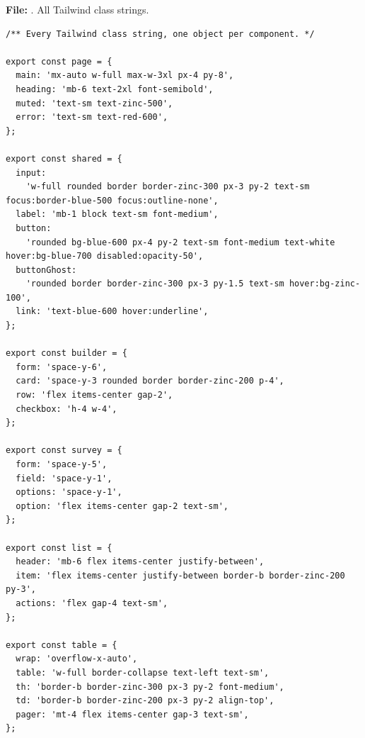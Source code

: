\documentclass[11pt,a4paper]{article}
\begin{document}
\textbf{File:} . All Tailwind class strings.\par
\begin{lstlisting}
/** Every Tailwind class string, one object per component. */

export const page = {
  main: 'mx-auto w-full max-w-3xl px-4 py-8',
  heading: 'mb-6 text-2xl font-semibold',
  muted: 'text-sm text-zinc-500',
  error: 'text-sm text-red-600',
};

export const shared = {
  input:
    'w-full rounded border border-zinc-300 px-3 py-2 text-sm focus:border-blue-500 focus:outline-none',
  label: 'mb-1 block text-sm font-medium',
  button:
    'rounded bg-blue-600 px-4 py-2 text-sm font-medium text-white hover:bg-blue-700 disabled:opacity-50',
  buttonGhost:
    'rounded border border-zinc-300 px-3 py-1.5 text-sm hover:bg-zinc-100',
  link: 'text-blue-600 hover:underline',
};

export const builder = {
  form: 'space-y-6',
  card: 'space-y-3 rounded border border-zinc-200 p-4',
  row: 'flex items-center gap-2',
  checkbox: 'h-4 w-4',
};

export const survey = {
  form: 'space-y-5',
  field: 'space-y-1',
  options: 'space-y-1',
  option: 'flex items-center gap-2 text-sm',
};

export const list = {
  header: 'mb-6 flex items-center justify-between',
  item: 'flex items-center justify-between border-b border-zinc-200 py-3',
  actions: 'flex gap-4 text-sm',
};

export const table = {
  wrap: 'overflow-x-auto',
  table: 'w-full border-collapse text-left text-sm',
  th: 'border-b border-zinc-300 px-3 py-2 font-medium',
  td: 'border-b border-zinc-200 px-3 py-2 align-top',
  pager: 'mt-4 flex items-center gap-3 text-sm',
};
\end{lstlisting}
\end{document}
